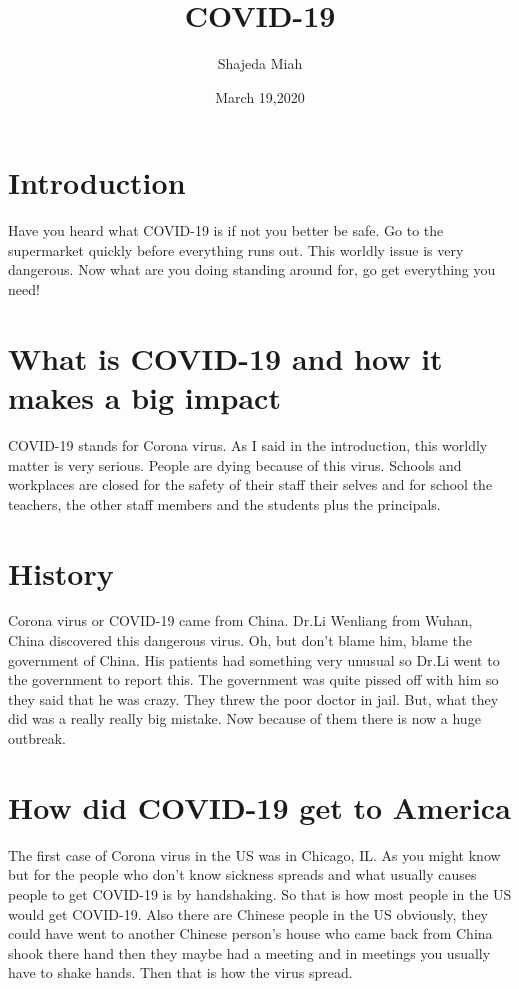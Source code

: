 \documentclass{article}
\title {COVID-19 }
\author{Shajeda Miah}
\date{March 19,2020}
\begin{document}
\maketitle

\section{Introduction}

Have you heard what COVID-19 is if not you better be safe. Go to the supermarket quickly before everything runs out. This worldly issue is very dangerous. Now what are you doing standing around for, go get everything you need!

\section {What is COVID-19 and how it makes a big impact}

COVID-19 stands for Corona virus. As I said in the introduction, this worldly matter is very serious. People are dying because of this virus. Schools and workplaces are closed for the safety of their staff their selves and for school the teachers, the other staff members and the students plus the principals.

\section {History}

Corona virus or COVID-19 came from China. Dr.Li Wenliang from Wuhan, China discovered this dangerous virus. Oh, but don't blame him, blame the government of China. His patients had something very unusual so Dr.Li went to the government to report this. The government was quite pissed off with him so they said that he was crazy. They threw the poor doctor in jail. But, what they did was a really really big mistake. Now because of them there is now a huge outbreak.

\section{How did COVID-19 get to America}

The first case of Corona virus in the US was in Chicago, IL. As you might know but for the people who don't know sickness spreads and what usually causes people to get COVID-19 is by handshaking. So that is how most people in the US would get COVID-19. Also there are Chinese people in the US obviously, they could have went to another Chinese person's house who came back from China shook there hand then they maybe had a meeting and in meetings you usually have to shake hands. Then that is how the virus spread.
\end{document}
